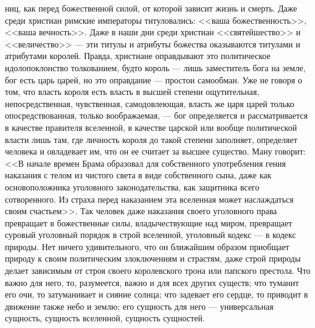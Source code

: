 \documentclass[12pt,oneside]{book}
\begin{document}
ниц, как перед божественной силой, от которой зависит жизнь и смерть. Даже среди христиан римские императоры титуловались: <<ваша божественность>>, <<ваша вечность>>. Даже в наши дни среди христиан <<святейшество>> и <<величество>> --- эти титулы и атрибуты божества оказываются титулами и атрибутами королей. Правда, христиане оправдывают это политическое идолопоклонство толкованием, будто король --- лишь заместитель бога на земле, бог есть царь царей, но это оправдание --- простои самообман. Уже не говоря о том, что власть короля есть власть в высшей степени ощутительная, непосредственная, чувственная, самодовлеющая, власть же царя царей только опосредствованная, только воображаемая, --- бог определяется и рассматривается в качестве правителя вселенной, в качестве царской или вообще политической власти лишь там, где личность короля до такой степени заполняет, определяет человека и овладевает им, что он ее считает за высшее существо. Ману говорит: <<В начале времен Брама образовал для собственного употребления гения наказания с телом из чистого света в виде собственного сына, даже как основоположника уголовного законодательства, как защитника всего сотворенного. Из страха перед наказанием эта вселенная может наслаждаться своим счастьем>>. Так человек даже наказания своего уголовного права превращает в божественные силы, владычествующие над миром, превращает суровый уголовный порядок в строй вселенной, уголовный кодекс --- в кодекс природы. Нет ничего удивительного, что он ближайшим образом приобщает природу к своим политическим злоключениям и страстям, даже строй природы делает зависимым от строя своего королевского трона или папского престола. Что важно для него, то, разумеется, важно и для всех других существ; что туманит его очи, то затуманивает и сияние солнца; что задевает его сердце, то приводит в движение также небо и землю; его сущность для него --- универсальная сущность, сущность вселенной, сущность сущностей.


\chapter{}
\end{document}
